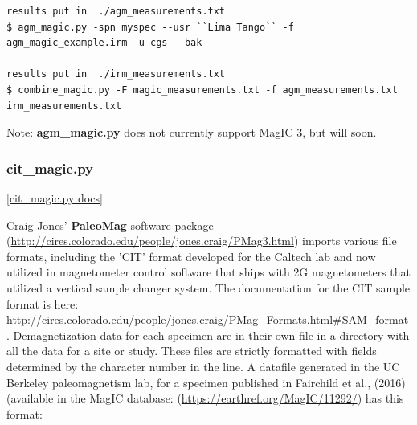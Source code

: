 \documentclass[11pt]{book}
\begin{document}
{{{{\begin{verbatim}
results put in  ./agm_measurements.txt
$ agm_magic.py -spn myspec --usr ``Lima Tango`` -f agm_magic_example.irm -u cgs  -bak

results put in  ./irm_measurements.txt
$ combine_magic.py -F magic_measurements.txt -f agm_measurements.txt irm_measurements.txt

\end{verbatim}

Note: {\bf agm\_magic.py} does not currently support MagIC 3, but will soon.


\subsubsection{cit\_magic.py}
\href{https://github.com/PmagPy/PmagPy/blob/master/programs/cit_magic.py}{[cit\_magic.py docs]}

 Craig Jones' {\bf PaleoMag} software package (\url{http://cires.colorado.edu/people/jones.craig/PMag3.html}) imports various file formats, including the 'CIT' format developed for the Caltech lab and now utilized in magnetometer control software that ships with 2G magnetometers that utilized a vertical sample changer system. The documentation for the CIT sample format is here: \url{http://cires.colorado.edu/people/jones.craig/PMag_Formats.html#SAM_format}. Demagnetization data for each specimen are in their own file in a directory with all the data for a site or study. These files are strictly formatted with fields determined by the character number in the line. A datafile generated in the UC Berkeley paleomagnetism lab, for a specimen published in Fairchild et al., (2016) \nocite{fairchild16} (available in the MagIC database: (\url{https://earthref.org/MagIC/11292/}) has this format:

}}}}
\end{document}
